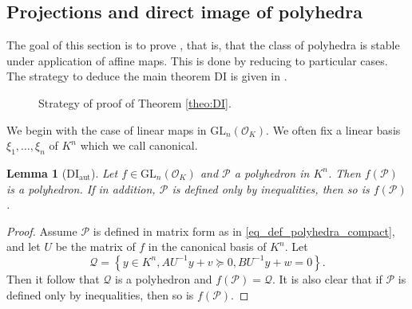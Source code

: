 \documentclass{elsarticle}
\theoremstyle{plain}
\newtheorem{lemma}[theorem]{Lemma}
\theoremstyle{definition}
\newcommand{\PP}{\mathcal{P}}
\newcommand{\Qc}{\mathcal{Q}}
\newcommand{\OK}{\mathcal{O}_K}
\newcommand{\GL}{\mathrm{GL}}
\begin{document}
\subsection{Projections and direct image of polyhedra}
\label{ssec:projections}
The goal of this section is to prove , that is, that
the class of polyhedra is stable under application of affine maps. This is done
by reducing to particular cases. The strategy to deduce the main theorem DI 
is given in .

\begin{figure}[!ht] 
\centering
{}
\caption{Strategy of proof of Theorem \ref{theo:DI}.}
\label{fig:di-properties}
\end{figure}

We begin with the case of linear maps in $\GL_n(\OK)$.
We often fix a linear basis $\xi_1,\ldots,\xi_n$ of $K^n$ which we call canonical.

\begin{lemma}[DI${}_{\mathrm{aut}}$]
Let $f \in \GL_n(\OK)$ and $\PP$ a polyhedron in $K^n$.
Then $f(\PP)$ is a polyhedron. \label{lem:DIaut}
If in addition, $\PP$ is defined only by inequalities,
then so is $f(\PP)$.
\end{lemma}
\begin{proof}
  Assume $\PP$ is defined in matrix form as in \eqref{eq_def_polyhedra_compact},
  and let $U$ be the matrix of
  $f$ in the canonical basis of $K^n$. Let
  \[\Qc=\left\lbrace y \in K^n,  AU^{-1} y+v \succeq 0, BU^{-1} y+w=0 \right\rbrace.\]
  Then it follow that $\Qc$ is a polyhedron and $f(\PP)=\Qc.$
  It is also clear that if $\PP$ is defined only by inequalities,
  then so is $f(\PP)$.
\end{proof}
\end{document}
